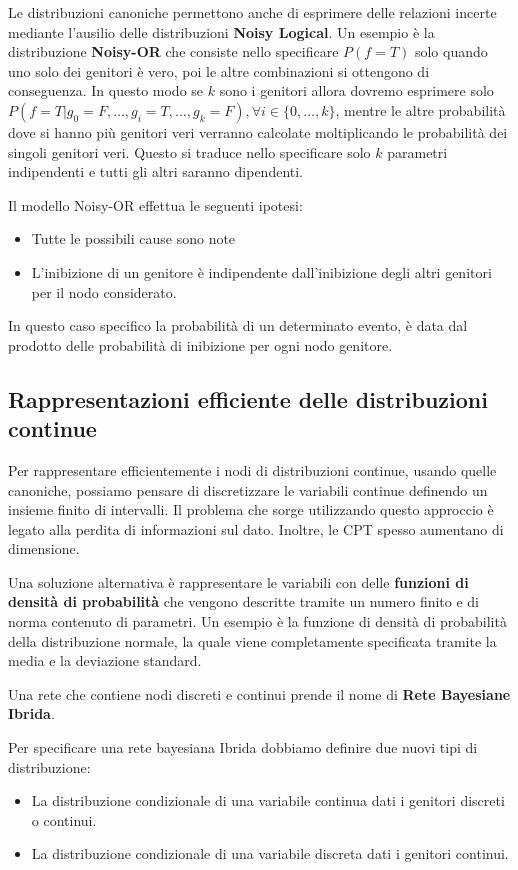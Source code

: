 Le distribuzioni canoniche permettono anche di esprimere delle relazioni incerte
mediante l'ausilio delle distribuzioni \textbf{Noisy Logical}. Un esempio è la
distribuzione \textbf{Noisy-OR} che consiste nello specificare $P(f = T)$ solo
quando uno solo dei genitori è vero, poi le altre combinazioni si ottengono
di conseguenza. In questo modo se $k$ sono i genitori allora dovremo esprimere
solo $P(f=T | g_0 = F, \dots, g_i = T, \dots, g_k=F), \forall i \in \{0,\dots, k\}$,
mentre le altre probabilità dove si hanno più genitori veri verranno calcolate
moltiplicando le probabilità dei singoli genitori veri. Questo si traduce nello specificare
solo $k$ parametri indipendenti e tutti gli altri saranno dipendenti.

Il modello Noisy-OR effettua le seguenti ipotesi:
\begin{itemize}
    \item Tutte le possibili cause sono note
    \item L'inibizione di un genitore è indipendente dall'inibizione degli altri
          genitori per il nodo considerato.
\end{itemize}
In questo caso specifico la probabilità di un determinato evento, è data dal
prodotto delle probabilità di inibizione per ogni nodo genitore.


\subsection{Rappresentazioni efficiente delle distribuzioni continue}
Per rappresentare efficientemente i nodi di distribuzioni continue, usando quelle
canoniche, possiamo pensare di discretizzare le variabili continue definendo un
insieme finito di intervalli. Il problema che sorge utilizzando questo approccio
è legato alla perdita di informazioni sul dato. Inoltre, le CPT spesso aumentano
di dimensione.

Una soluzione alternativa è rappresentare le variabili con delle \textbf{funzioni
    di densità di probabilità} che vengono descritte tramite un numero finito e di
norma contenuto di parametri. Un esempio è la funzione di densità di probabilità
della distribuzione normale, la quale viene completamente specificata tramite
la media e la deviazione standard.
\begin{definizione}
    Una rete che contiene nodi discreti e continui prende il nome di \textbf{Rete
        Bayesiane Ibrida}.
\end{definizione}
Per specificare una rete bayesiana Ibrida dobbiamo definire due nuovi tipi di
distribuzione:
\begin{itemize}
    \item La distribuzione condizionale di una variabile continua dati i genitori
          discreti o continui.
    \item La distribuzione condizionale di una variabile discreta dati i genitori
          continui.
\end{itemize}
